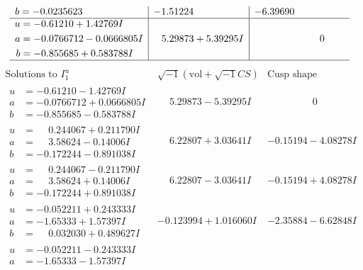 \documentclass[1p]{elsarticle_modified}
\theoremstyle{definition}
\newcommand{\I}{\sqrt{-1}}
\begin{document}
$$\begin{array}{c|c|c}
\begin{aligned}
b &= -0.0235623\phantom{ +0.000000I}\end{aligned}
 & -1.51224\phantom{ +0.000000I} & -6.39690\phantom{ +0.000000I} \\ \hline\begin{aligned}
u &= -0.61210 + 1.42769 I \\
a &= -0.0766712 - 0.0666805 I \\
b &= -0.855685 + 0.583788 I\end{aligned}
 & \phantom{-}5.29873 + 5.39295 I & \phantom{-0.000000 } 0\\
 \hline 
 \end{array}$$\newpage$$\begin{array}{c|c|c}  
\text{Solutions to }I^u_{1}& \I (\text{vol} + \sqrt{-1}CS) & \text{Cusp shape}\\
 \hline 
\begin{aligned}
u &= -0.61210 - 1.42769 I \\
a &= -0.0766712 + 0.0666805 I \\
b &= -0.855685 - 0.583788 I\end{aligned}
 & \phantom{-}5.29873 - 5.39295 I & \phantom{-0.000000 } 0 \\ \hline\begin{aligned}
u &= \phantom{-}0.244067 + 0.211790 I \\
a &= \phantom{-}3.58624 - 0.14006 I \\
b &= -0.172244 - 0.891038 I\end{aligned}
 & \phantom{-}6.22807 + 3.03641 I & -0.15194 - 4.08278 I \\ \hline\begin{aligned}
u &= \phantom{-}0.244067 - 0.211790 I \\
a &= \phantom{-}3.58624 + 0.14006 I \\
b &= -0.172244 + 0.891038 I\end{aligned}
 & \phantom{-}6.22807 - 3.03641 I & -0.15194 + 4.08278 I \\ \hline\begin{aligned}
u &= -0.052211 + 0.243333 I \\
a &= -1.65333 + 1.57397 I \\
b &= \phantom{-}0.032030 + 0.489627 I\end{aligned}
 & -0.123994 + 1.016060 I & -2.35884 - 6.62848 I \\ \hline\begin{aligned}
u &= -0.052211 - 0.243333 I \\
a &= -1.65333 - 1.57397 I \\

\end{aligned}
\end{array}$$
\end{document}
